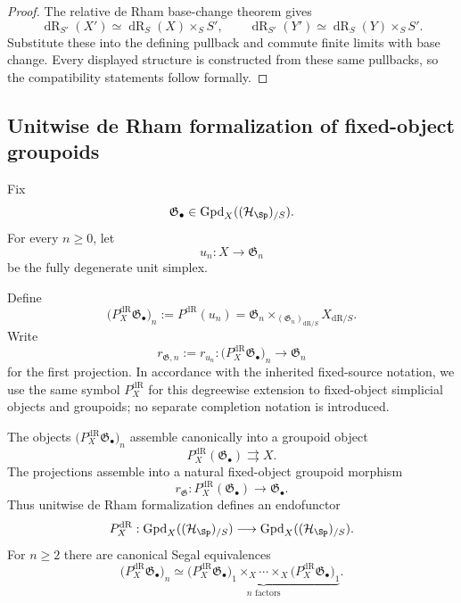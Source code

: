 \begin{proof}
The relative de Rham base-change theorem gives
\[
    \operatorname{dR}_{S'}(X')\simeq \operatorname{dR}_S(X)\times_SS',
    \qquad
    \operatorname{dR}_{S'}(Y')\simeq \operatorname{dR}_S(Y)\times_SS'.
\]
Substitute these into the defining pullback and commute finite limits with
base change.  Every displayed structure is constructed from these same
pullbacks, so the compatibility statements follow formally.
\end{proof}

\subsection{Unitwise de Rham formalization of fixed-object groupoids}

Fix
\[
    \mathfrak G_\bullet
    \in
    \operatorname{Gpd}_X((\mathcal H_{\Sp})_{/S}).
\]
For every $n\geq0$, let
\[
    u_n:X\longrightarrow\mathfrak G_n
\]
be the fully degenerate unit simplex.

\begin{definition}
\label{def:unitwise-groupoid-formalization}
Define
\[
    \bigl(P_X^{\mathrm{dR}}\mathfrak G_\bullet\bigr)_n
    :=
    P^{\mathrm{dR}}(u_n)
    =
    \mathfrak G_n
    \times_{(\mathfrak G_n)_{\mathrm{dR}/S}}
    X_{\mathrm{dR}/S}.
\]
Write
\[
    r_{\mathfrak G,n}
    :=
    r_{u_n}:
    \bigl(P_X^{\mathrm{dR}}\mathfrak G_\bullet\bigr)_n
    \longrightarrow
    \mathfrak G_n
\]
for the first projection.  In accordance with the inherited fixed-source
notation, we use the same symbol \(P_X^{\mathrm{dR}}\) for this degreewise
extension to fixed-object simplicial objects and groupoids; no separate
completion notation is introduced.
\end{definition}

\begin{proposition}
\label{prop:unitwise-formalization-groupoid}
The objects
$\bigl(P_X^{\mathrm{dR}}\mathfrak G_\bullet\bigr)_n$ assemble canonically into a
groupoid object
\[
    P_X^{\mathrm{dR}}(\mathfrak G_\bullet)
    \rightrightarrows X.
\]
The projections assemble into a natural fixed-object groupoid morphism
\[
    r_{\mathfrak G}:
    P_X^{\mathrm{dR}}(\mathfrak G_\bullet)
    \longrightarrow
    \mathfrak G_\bullet.
\]
Thus unitwise de Rham formalization defines an endofunctor
\[
    P_X^{\mathrm{dR}}:
    \operatorname{Gpd}_X((\mathcal H_{\Sp})_{/S})
    \longrightarrow
    \operatorname{Gpd}_X((\mathcal H_{\Sp})_{/S}).
\]
For $n\ge2$ there are canonical Segal equivalences
\[
    \bigl(P_X^{\mathrm{dR}}\mathfrak G_\bullet\bigr)_n
    \simeq
    \underbrace{
    \bigl(P_X^{\mathrm{dR}}\mathfrak G_\bullet\bigr)_1
    \times_X\cdots\times_X
    \bigl(P_X^{\mathrm{dR}}\mathfrak G_\bullet\bigr)_1
    }_{n\text{ factors}}.
\]
\end{proposition}

